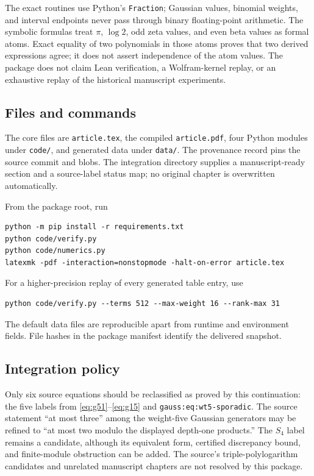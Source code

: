 \documentclass[11pt,a4paper]{article}
\numberwithin{equation}{section}
\theoremstyle{definition}
\theoremstyle{remark}
\begin{document}
The exact routines use Python's \texttt{Fraction}; Gaussian values, binomial weights, and interval endpoints never pass through binary floating-point arithmetic. The symbolic formulas treat $\pi$, $\log2$, odd zeta values, and even beta values as formal atoms. Exact equality of two polynomials in those atoms proves that two derived expressions agree; it does not assert independence of the atom values. The package does not claim Lean verification, a Wolfram-kernel replay, or an exhaustive replay of the historical manuscript experiments.

\subsection{Files and commands}
The core files are \texttt{article.tex}, the compiled \texttt{article.pdf}, four Python modules under \texttt{code/}, and generated data under \texttt{data/}. The provenance record pins the source commit and blobs. The integration directory supplies a manuscript-ready section and a source-label status map; no original chapter is overwritten automatically.

From the package root, run
\begin{lstlisting}
python -m pip install -r requirements.txt
python code/verify.py
python code/numerics.py
latexmk -pdf -interaction=nonstopmode -halt-on-error article.tex
\end{lstlisting}
For a higher-precision replay of every generated table entry, use
\begin{lstlisting}
python code/verify.py --terms 512 --max-weight 16 --rank-max 31
\end{lstlisting}
The default data files are reproducible apart from runtime and environment fields. File hashes in the package manifest identify the delivered snapshot.

\subsection{Integration policy}
Only six source equations should be reclassified as proved by this continuation: the five labels from \eqref{eq:g51}--\eqref{eq:g15} and \texttt{gauss:eq:wt5-sporadic}. The source statement ``at most three'' among the weight-five Gaussian generators may be refined to ``at most two modulo the displayed depth-one products.'' The $S_4$ label remains a candidate, although its equivalent form, certified discrepancy bound, and finite-module obstruction can be added. The source's triple-polylogarithm candidates and unrelated manuscript chapters are not resolved by this package.
\end{document}
